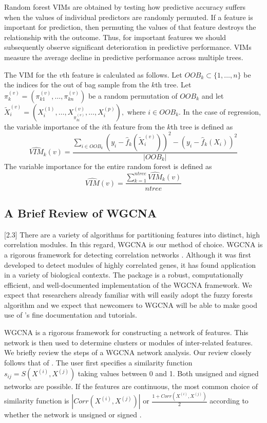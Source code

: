 \documentclass[article,shortnames]{jss}
\begin{document}
Random forest VIMs are obtained by testing how predictive accuracy suffers when the values of individual predictors are randomly permuted.  
If a feature is important for prediction, then permuting the values of that feature destroys the relationship with the outcome.
Thus, for important features we should subsequently observe significant deterioration in predictive performance.
VIMs measure the average decline in predictive performance across multiple trees.  

The VIM for the $v$th feature is calculated as follows.
Let $OOB_{k} \subset \{1,\ldots, n\}$ be the indices for the out of bag sample from the $k$th tree.  
Let $\pi_{k}^{(v)}=(\pi^{(v)}_{k1},\ldots,\pi^{(v)}_{kn})$ be a random permutation of $OOB_{k}$ and 
let $\tilde{X}_{i}^{(v)} = (X_{i}^{(1)},\ldots,X^{(v)}_{\pi^{(v)}_{ki}},\ldots,X_{i}^{(p)}),$ where $i \in OOB_{k}$.   
In the case of regression, the variable importance of the $i$th feature from the $k$th tree is defined as
\begin{equation}
\widehat{VIM}_{k}(v)= \frac{\sum_{i \in OOB_{k}}(y_{i}-\hat{f}_{k}(\tilde{X}_{i}^{(v)}))^{2} - (y_{i} - \hat{f}_{k}(X_{i}))^{2}}{|OOB_{k}|}
\end{equation}
The variable importance for the entire random forest is defined as
\begin{equation}
\widehat{VIM}(v) = \frac{\sum_{k=1}^{ntree}\widehat{VIM}_{k}(v)}{ntree}
\end{equation}

\subsection{A Brief Review of WGCNA}[2.3]
There are a variety of algorithms for partitioning features into distinct, high correlation modules.  In this regard, WGCNA is our method of choice.  WGCNA is a rigorous framework for detecting correlation networks \citep{zhang2005general}.  Although it was first developed to detect modules of highly correlated genes, it has found application in a variety of biological contexts.  The  package  is a robust, computationally efficient, and well-documented implementation of the WGCNA framework.  We expect that researchers already familiar with  will easily adopt the fuzzy forests algorithm and we expect that newcomers to WGCNA will be able to make good use of 's fine documentation and tutorials.

WGCNA is a rigorous framework for constructing a network of features. 
This network is then used to determine clusters or modules of inter-related features. 
We briefly review the steps of a WGCNA network analysis.  Our review closely follows that of \cite{zhang2005general}.  
The user first specifies a similarity function $s_{ij}=S(X^{(i)},X^{(j)})$ taking values between 0 and 1.  Both unsigned and signed 
networks are possible.  If the features are continuous, the most common choice of similarity function is $|Corr(X^{(i)},X^{(j)})|$ or 
$\frac{1 + Corr(X^{(i)},X^{(j)})}{2}$  according to whether the network is unsigned or signed \citep{zhang2005general}.
\end{document}
